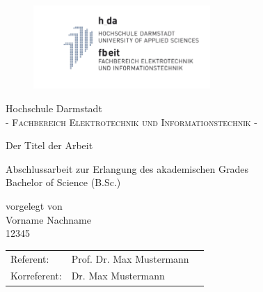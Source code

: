 \pagestyle{empty} %

\begin{figure}[t]
	\centering
	\includegraphics[width=0.6\textwidth]{Pic/logo_fbeit}
\end{figure}


\begin{center}
\Large Hochschule Darmstadt \\
\normalsize \textsc{- Fachbereich Elektrotechnik und Informationstechnik -} \\

\vspace{105 pt}

\Huge Der Titel der Arbeit \\ 
\normalsize
\vspace{20 pt}

Abschlussarbeit zur Erlangung des akademischen Grades \\ 
Bachelor of Science (B.Sc.) 

\vspace{75 pt}


vorgelegt von \\
\vspace{5 pt}
Vorname Nachname \\
12345
\vspace{115 pt}

\begin{tabular}[h]{p{4cm}l l}
	Referent: & Prof. Dr. Max Mustermann\\
	Korreferent: & Dr. Max Mustermann
\end{tabular}


\end{center}

